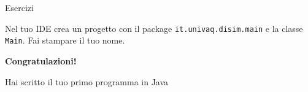 \documentclass[aspectratio=169,10pt,t]{beamer}
\begin{document}
\begin{frame}{Esercizi}
  \begin{esercizio}
    Nel tuo IDE crea un progetto con il package \texttt{it.univaq.disim.main} e la classe \texttt{Main}. Fai stampare il tuo nome.
  \end{esercizio}
\end{frame}

\begin{frame}[plain]
  \vfill
  \begin{center}
    {\color{accento}\fontsize{26}{30}\selectfont\bfseries Congratulazioni!\par}
    \vspace{1em}
    {\large Hai scritto il tuo primo programma in Java\par}
  \end{center}
  \vfill
\end{frame}
\end{document}
